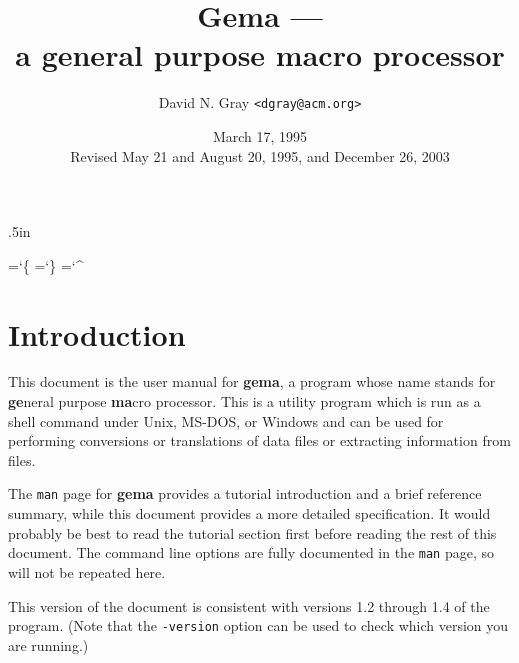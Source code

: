 
\pagestyle{headings}

\oddsidemargin 0.5in \evensidemargin 0.5in
\topmargin 0pt \headsep .5in
\textheight 8.1in \textwidth 6in

\title{\bf Gema --- \\ a general purpose macro processor}
\author{David N. Gray \verb/<dgray@acm.org>/}
\date{March 17, 1995 \\ Revised May 21 and August 20, 1995, and December 26, 2003}



\maketitle

\chardef\ttlb=`\{
\chardef\ttrb=`\}
\chardef\ttcaret=`\^

\section{Introduction}

This document is the user manual for {\bf gema}, a program whose name
stands for {\bf ge}neral purpose {\bf ma}cro processor.
This is a utility program which is run as a shell command under Unix,
MS-DOS, or Windows and can be used for performing conversions or translations
of data files or extracting information from files.

The {\tt man} page for {\bf gema} provides a tutorial introduction and a
brief reference summary, while this document provides a
more detailed specification.
It would probably be best to read the tutorial section first before
reading the rest of this document.  The command line options are fully
documented in the {\tt man} page, so will not be repeated here.

This version of the document is consistent with versions 1.2 through 1.4 of the
program.
(Note that the \verb/-version/ option can be used to check which version
you are running.)








